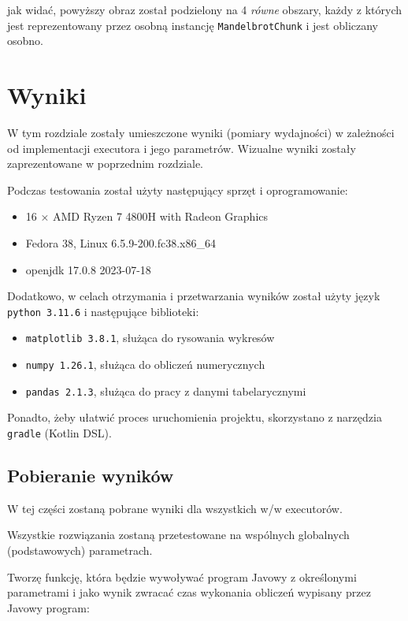 \documentclass[11pt]{article}
\providecommand{\tightlist}{%
      \setlength{\itemsep}{0pt}\setlength{\parskip}{0pt}}
\begin{document}
jak widać, powyższy obraz został podzielony na 4 \emph{równe} obszary,
każdy z których jest reprezentowany przez osobną instancję
\texttt{MandelbrotChunk} i jest obliczany osobno.

    \hypertarget{wyniki}{%
\section{Wyniki}\label{wyniki}}

W tym rozdziale zostały umieszczone wyniki (pomiary wydajności) w
zależności od implementacji executora i jego parametrów. Wizualne wyniki
zostały zaprezentowane w poprzednim rozdziale.

Podczas testowania został użyty następujący sprzęt i oprogramowanie:

\begin{itemize}
\tightlist
\item
  16 × AMD Ryzen 7 4800H with Radeon Graphics
\item
  Fedora 38, Linux 6.5.9-200.fc38.x86\_64
\item
  openjdk 17.0.8 2023-07-18
\end{itemize}

Dodatkowo, w celach otrzymania i przetwarzania wyników został użyty
język \texttt{python\ 3.11.6} i następujące biblioteki:

\begin{itemize}
\tightlist
\item
  \texttt{matplotlib\ 3.8.1}, służąca do rysowania wykresów
\item
  \texttt{numpy\ 1.26.1}, służąca do obliczeń numerycznych
\item
  \texttt{pandas\ 2.1.3}, służąca do pracy z danymi tabelarycznymi
\end{itemize}

Ponadto, żeby ułatwić proces uruchomienia projektu, skorzystano z
narzędzia \texttt{gradle} (Kotlin DSL).

    \hypertarget{pobieranie-wynikuxf3w}{%
\subsection{Pobieranie wyników}\label{pobieranie-wynikuxf3w}}

W tej części zostaną pobrane wyniki dla wszystkich w/w executorów.

Wszystkie rozwiązania zostaną przetestowane na wspólnych globalnych
(podstawowych) parametrach.

    Tworzę funkcję, która będzie wywoływać program Javowy z określonymi
parametrami i jako wynik zwracać czas wykonania obliczeń wypisany przez
Javowy program:
\end{document}
